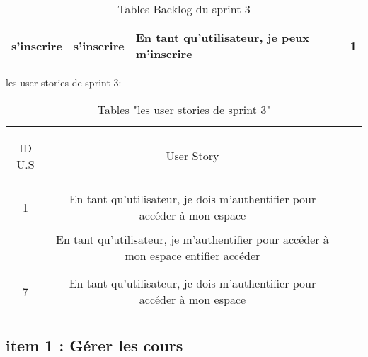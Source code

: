 \begin{table}[]
\begin{tabular}{|l|l|l|l|}
		\textbf{s'inscrire}                    & s'inscrire                                                            & En tant qu'utilisateur, je peux m'inscrire                                                                        & 1    \\ \hline
	\end{tabular}
	
	
	\caption{Tables Backlog du sprint 3}
	\label{Tables Backlog du sprint 3}
\end{table}










\begin{table}[h]
{\Large\color{cyan} les user stories de sprint 3:}\\
	
	\begin{center}
		\begin{tabular}{>{\begin{bf} } c <{\end{bf}}ccc}
			
			\rowcolor{-blue!20!red}ID U.S & \begin{bf}User Story \end{bf}  & \\
			
			1 & En tant qu’utilisateur, je dois m’authentifier pour accéder à mon espace \\
			& En tant qu’utilisateur, je  m’authentifier pour accéder à mon espace entifier accéder
			\\
			& \\
			7 & En tant qu’utilisateur, je dois m’authentifier pour accéder à mon espace \\
			
			
		\end{tabular}
	\end{center}
	\caption{Tables  "les user stories de sprint 3"}
	\label{les user stories de sprint 3}
\end{table}


\clearpage

\clearpage
 
\subsection{item 1 : Gérer les cours}

